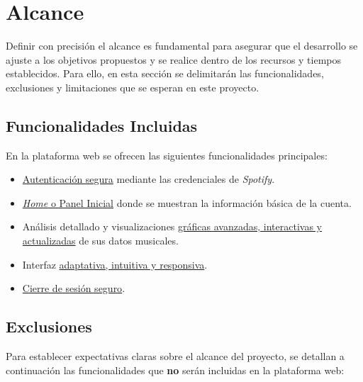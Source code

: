 \section{Alcance}

Definir con precisión el alcance es fundamental para asegurar que el desarrollo se ajuste a los objetivos propuestos y se realice dentro de los recursos y tiempos establecidos. Para ello, en esta sección se delimitarán las funcionalidades, exclusiones y limitaciones que se esperan en este proyecto.

\subsection{Funcionalidades Incluidas}

En la plataforma web se ofrecen las siguientes funcionalidades principales:

\begin{itemize}
    \item \underline{Autenticación segura} mediante las credenciales de \textit{Spotify}.
    \item \underline{\textit{Home} o Panel Inicial} donde se muestran la información básica de la cuenta.
    \item Análisis detallado y visualizaciones \underline{gráficas avanzadas, interactivas y actualizadas} de sus datos musicales.
    \item Interfaz \underline{adaptativa, intuitiva y responsiva}.
    \item \underline{Cierre de sesión seguro}.
\end{itemize}

\subsection{Exclusiones}

Para establecer expectativas claras sobre el alcance del proyecto, se detallan a continuación las funcionalidades que \textbf{no} serán incluidas en la plataforma web:

